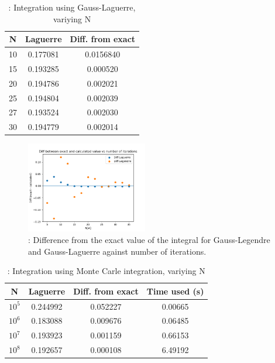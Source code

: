 \documentclass{article}
\begin{document}
\begin{table}[h!]
  \caption{: Integration using Gauss-Laguerre, variying N}
  \begin{tabular}{c c c}
    N & Laguerre & Diff. from exact \\
    \hline
    10 & 0.177081 & 0.0156840 \\
    15 & 0.193285 & 0.000520 \\
    20 & 0.194786 & 0.002021 \\
    25 & 0.194804 & 0.002039 \\
    27 & 0.193524 & 0.002030 \\
    30 & 0.194779 & 0.002014 \\
  \end{tabular}
  \label{Tab: Laguerre}
\end{table}

\begin{figure}[hbt]
\begin{center}
    \includegraphics[width=200px]{Leg_lag_diff.png}
    \caption{: Difference from the exact value of the integral for Gauss-Legendre and Gauss-Laguerre against number of iterations.}
    \label{fig:diff}
\end{center}
\end{figure}


\begin{table}[h!]
  \caption{: Integration using Monte Carle integration, variying N}
  \begin{tabular}{c c c c}
    N & Laguerre & Diff. from exact & Time used (s) \\
    \hline
    $10^5$ & 0.244992 & 0.052227  & 0.00665 \\
    $10^6$ & 0.183088 & 0.009676  & 0.06485 \\
    $10^7$ & 0.193923 & 0.001159  & 0.66153 \\
    $10^8$ & 0.192657 & 0.000108  & 6.49192 \\
  \end{tabular}
  \label{Tab: MC}
\end{table}
\end{document}
